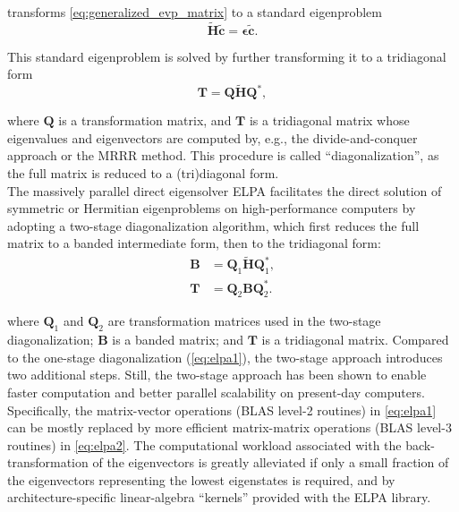 \documentclass{report}
\begin{document}
\noindent transforms \ref{eq:generalized_evp_matrix} to a standard eigenproblem\\
\begin{equation}
\label{eq:standard_evp}
\boldsymbol{\tilde{H}} \boldsymbol{\tilde{c}} = \boldsymbol{\epsilon} \boldsymbol{\tilde{c}} .
\end{equation}

\noindent This standard eigenproblem is solved by further transforming it to a tridiagonal form\\
\begin{equation}
\label{eq:elpa1}
\boldsymbol{T} = \boldsymbol{Q} \boldsymbol{\tilde{H}} \boldsymbol{Q}^* ,
\end{equation}

\noindent where $\boldsymbol{Q}$ is a transformation matrix, and $\boldsymbol{T}$ is a tridiagonal matrix whose eigenvalues and eigenvectors are computed by, e.g., the divide-and-conquer approach or the MRRR method.  This procedure is called ``diagonalization'', as the full matrix is reduced to a (tri)diagonal form.\\

The massively parallel direct eigensolver ELPA \cite{elpa_auckenthaler_2011,elpa_marek_2014} facilitates the direct solution of symmetric or Hermitian eigenproblems on high-performance computers by adopting a two-stage diagonalization algorithm, which first reduces the full matrix to a banded intermediate form, then to the tridiagonal form:\\
\begin{equation}
\label{eq:elpa2}
\begin{split}
\boldsymbol{B} & = \boldsymbol{Q}_1 \boldsymbol{\tilde{H}} \boldsymbol{Q}_1^* ,\\
\boldsymbol{T} & = \boldsymbol{Q}_2 \boldsymbol{B} \boldsymbol{Q}_2^* .
\end{split}
\end{equation}

\noindent where $\boldsymbol{Q}_1$ and $\boldsymbol{Q}_2$ are transformation matrices used in the two-stage diagonalization; $\boldsymbol{B}$ is a banded matrix; and $\boldsymbol{T}$ is a tridiagonal matrix.  Compared to the one-stage diagonalization (\ref{eq:elpa1}), the two-stage approach introduces two additional steps.  Still, the two-stage approach has been shown to enable faster computation and better parallel scalability on present-day computers.  Specifically, the matrix-vector operations (BLAS level-2 routines) in \ref{eq:elpa1} can be mostly replaced by more efficient matrix-matrix operations (BLAS level-3 routines) in \ref{eq:elpa2}.  The computational workload associated with the back-transformation of the eigenvectors is greatly alleviated if only a small fraction of the eigenvectors representing the lowest eigenstates is required, and by architecture-specific linear-algebra ``kernels'' provided with the ELPA library.\\
\end{document}
